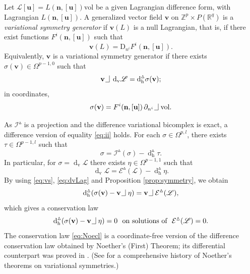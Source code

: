 \documentclass[11pt]{article} %
\numberwithin{equation}{section}
\newcommand{\intpsym}{\,\, \setlength{\unitlength}{0.4mm}
	\begin{picture}(0, 0)(5, 5)%
	\put(0, 4){\line(1,0){5}} \put(5,4){\line(0,1){8}}
	\end{picture}\,\,}
\newcommand{\intp}{\,\,\intpsym}
\newcommand{\upd}{\operatorname{d}}
\newcommand{\uph}{\operatorname{h}}
\newcommand{\upv}{\operatorname{v}}
\newcommand{\p}{\partial}
\newcommand{\dv}{\upd_{\upv}\!}
\newcommand{\diffi}{\mathrm{D}_{n^i}}
\newcommand{\mbn}{\mathbf{n}}
\newcommand{\mbu}{\mathbf{u}}
\newcommand{\mbv}{\mathbf{v}}
\newcommand{\mcE}{\mathcal{E}}
\newcommand{\mcI}{\mathcal{I}}
\newcommand{\msL}{\mathscr{L}}
\newcommand{\dDh}{\upd^{\vartriangle}_{\uph}}
\theoremstyle{plain}
\theoremstyle{definition}
\begin{document}
Let
$\msL[\mbu]=L(\mbn,[\mbu])\text{vol}$ be a given Lagrangian difference form, with Lagrangian $L(\mbn,[\mbu])$.
A generalized vector field $\mbv$ on $\mathbb{Z}^p\times P(\mathbb{R}^q)$ is a
\textit{variational symmetry generator} if $\mbv(L)$ is a null Lagrangian, that is, if
there exist functions $F^i(\mbn,[\mbu])$ such that
\begin{equation}
\mbv(L)=\diffi F^i(\mbn,[\mbu]).
\end{equation}
Equivalently, $\mbv$ is a variational symmetry generator if there exists
$\sigma(\mbv)\in\Omega^{p-1,0}$ such that
\begin{equation}\label{eq:vs}
\mbv\intp\dv \msL
=\dDh\!\sigma(\mbv);
\end{equation}
in coordinates,
\begin{equation}
\sigma(\mbv) =F^i(\mbn,[\mbu])\,\p_{n^i}\intp\text{vol}.
\end{equation}

As $\mcI^{\vartriangle}$ is a projection and the difference variational bicomplex is exact, a difference version of equality \eqref{eq:ii} holds. For each $\sigma\in\Omega^{p,l}$, there exists $\tau\in\Omega^{p-1,l}$ such that 
\begin{equation}\label{eq:dissig}
\sigma=\mcI^{\vartriangle}(\sigma)-\upd_{\uph}^{\vartriangle}\!\tau.
\end{equation}
In particular, for $\sigma=\dv \msL$ there exists $\eta\in\Omega^{p-1,1}$ such that
\begin{equation}\label{eq:dvLag}
\dv \msL=\mcE^{\vartriangle}(\msL)
-\dDh\!\eta.
\end{equation}
By using \eqref{eq:vs}, \eqref{eq:dvLag} and Proposition \ref{prop:symmetry}, we obtain
\begin{equation}\label{eq:ddcl}
\dDh\!\left(\sigma(\mbv)-\mbv\intp\eta\right)
=\mbv\intp\mcE^{\vartriangle}(\msL),
\end{equation}
which gives a conservation law \label{sectiondvb}
\begin{equation}
\label{eq:Noecl}
\dDh\!\left(\sigma(\mbv)-\mbv\intp\eta\right)=0
\text{~~on solutions of~~}
\mcE^{\vartriangle}(\msL)=0.
\end{equation}
The conservation law \eqref{eq:Noecl} is a coordinate-free version of the difference conservation law obtained by Noether's (First) Theorem; its differential counterpart was proved in \cite{BrHyLa2010}. (See \cite{Ko2011} for a comprehensive history of Noether's theorems on variational symmetries.)


\end{document}
